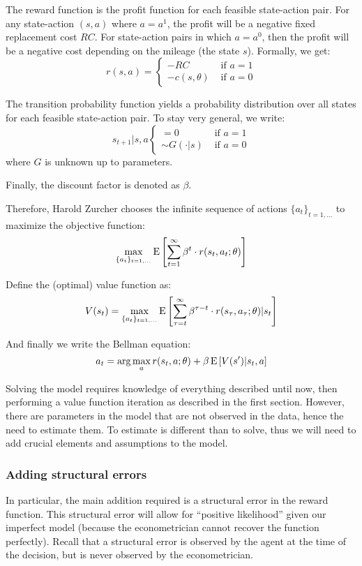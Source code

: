 The reward function is the profit function for each feasible state-action pair. For any state-action $(s, a)$ where $a = a^1$, the profit will be a negative fixed replacement cost $RC$. For state-action pairs in which $a = a^0$, then the profit will be a negative cost depending on the mileage (the state $s$). Formally, we get: $$ r(s, a) = \begin{cases} - RC & \text{ if } a = 1 \\ - c (s, \theta) & \text{ if } a = 0 \end{cases} $$

The transition probability function yields a probability distribution over all states for each feasible state-action pair. To stay very general, we write: $$ s_{t+1} | s, a \begin{cases}= 0 &\text{ if } a = 1 \\  \sim G(\cdot | s) &  \text{ if } a = 0 \end{cases} $$ where $G$ is unknown up to parameters.

Finally, the discount factor is denoted as $\beta$.

Therefore, Harold Zurcher chooses the infinite sequence of actions $\{a_t\}_{t=1, ...}$ to maximize the objective function: $$\max_{\{a_t\}_{t=1, ...}} \operatorname{E}\left[\sum_{t = 1}^{\infty} \beta^t\cdot r(s_t, a_t; \theta) \right] $$

Define the (optimal) value function as: $$
V(s_t) = \max_{\{a_t\}_{t=1, ...}} \operatorname{E}\left[\sum_{\tau = t}^{\infty} \beta^{\tau - t} \cdot r(s_\tau, a_\tau; \theta) | s_t \right] $$

And finally we write the Bellman equation: $$a_t = \arg\max_{a} r(s_t, a; \theta) + \beta \operatorname{E}\left[ V(s') | s_t, a \right] $$

Solving the model requires knowledge of everything described until now, then performing a value function iteration as described in the first section. However, there are parameters in the model that are not observed in the data, hence the need to estimate them. To estimate is different than to solve, thus we will need to add crucial elements and assumptions to the model.

\subsubsection{Adding structural errors}

In particular, the main addition required is a structural error in the reward function. This structural error will allow for ``positive likelihood'' given our imperfect model (because the econometrician cannot recover the function perfectly). Recall that a structural error is observed by the agent at the time of the decision, but is never observed by the econometrician.

